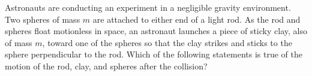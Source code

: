 \documentclass{../../../oss-apphys-exam}
\begin{document}
\begin{questions}
    
  \question Astronauts are conducting an experiment in a negligible gravity
  environment. Two spheres of mass $m$ are attached to either end of a light
  rod. As the rod and spheres float motionless in space, an astronaut launches
  a piece of sticky clay, also of mass $m$, toward one of the spheres so that
  the clay strikes and sticks to the sphere perpendicular to the rod. Which of
  the following statements is true of the motion of the rod, clay, and spheres
  after the collision?
  \begin{center}
\end{center}
\end{questions}
\end{document}
